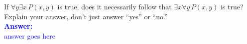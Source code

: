 \item{}
If $\forall y\exists x\,P(x,y)$ is true, does it necessarily follow that
$\exists x\forall y\,P(x,y)$ is true? Explain your answer, don't just answer
``yes'' or ``no.''\\[12pt]
\ifanswers
\textcolor{blue}{
\textbf{Answer:}\\[6pt]
answer goes here
}
\newpage
\fi
